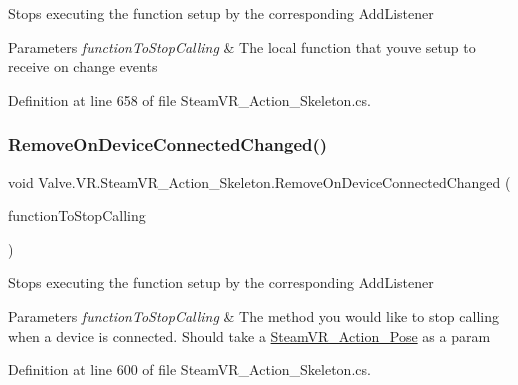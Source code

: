 Stops executing the function setup by the corresponding Add\+Listener 


\begin{DoxyParams}{Parameters}
{\em function\+To\+Stop\+Calling} & The local function that you\textquotesingle{}ve setup to receive on change events\\
\hline
\end{DoxyParams}


Definition at line 658 of file Steam\+V\+R\+\_\+\+Action\+\_\+\+Skeleton.\+cs.

\mbox{\label{class_valve_1_1_v_r_1_1_steam_v_r___action___skeleton_a2079e2dfc22a35ec170188e84ef24567}} 
\subsubsection{\texorpdfstring{RemoveOnDeviceConnectedChanged()}{RemoveOnDeviceConnectedChanged()}}
{\footnotesize\ttfamily void Valve.\+V\+R.\+Steam\+V\+R\+\_\+\+Action\+\_\+\+Skeleton.\+Remove\+On\+Device\+Connected\+Changed (\begin{DoxyParamCaption}\item[{\mbox{\hyperlink{class_valve_1_1_v_r_1_1_steam_v_r___action___skeleton_a737d68e8f67790bf838b4f5bac3ffae1}{Device\+Connected\+Change\+Handler}}}]{function\+To\+Stop\+Calling }\end{DoxyParamCaption})}



Stops executing the function setup by the corresponding Add\+Listener 


\begin{DoxyParams}{Parameters}
{\em function\+To\+Stop\+Calling} & The method you would like to stop calling when a device is connected. Should take a \mbox{\hyperlink{class_valve_1_1_v_r_1_1_steam_v_r___action___pose}{Steam\+V\+R\+\_\+\+Action\+\_\+\+Pose}} as a param\\
\hline
\end{DoxyParams}


Definition at line 600 of file Steam\+V\+R\+\_\+\+Action\+\_\+\+Skeleton.\+cs.

\mbox{\label{class_valve_1_1_v_r_1_1_steam_v_r___action___skeleton_a3c47b5010ed77fe4d516ac3321778249}} 
